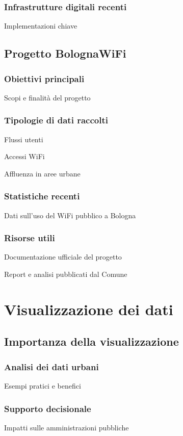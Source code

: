\subsubsection{Infrastrutture digitali recenti}
Implementazioni chiave

\subsection{Progetto BolognaWiFi}
\subsubsection{Obiettivi principali}
Scopi e finalità del progetto

\subsubsection{Tipologie di dati raccolti}
Flussi utenti

Accessi WiFi

Affluenza in aree urbane

\subsubsection{Statistiche recenti}
Dati sull'uso del WiFi pubblico a Bologna

\subsubsection{Risorse utili}
Documentazione ufficiale del progetto

Report e analisi pubblicati dal Comune


\section{Visualizzazione dei dati}  %
\subsection{Importanza della visualizzazione}
\subsubsection{Analisi dei dati urbani}
Esempi pratici e benefici

\subsubsection{Supporto decisionale}
Impatti sulle amministrazioni pubbliche

